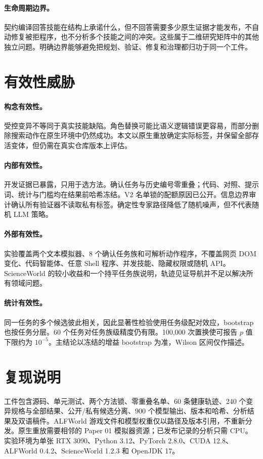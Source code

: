 \documentclass[10pt]{article}
\begin{document}
\paragraph{生命周期边界。}
契约编译回答技能在结构上承诺什么，但不回答需要多少原生证据才能发布，不自动修复被拒程序，也不分析多个技能之间的冲突。这些属于二维研究矩阵中的其他独立问题。明确边界能够避免把规划、验证、修复和治理都归功于同一个工件。

\section{有效性威胁}
\paragraph{构念有效性。}
受控变异不等同于真实技能缺陷。角色替换可能比语义逻辑错误更容易，而部分删除搜索动作在原生环境中仍然成功。本文以原生重放确定实际标签，并保留全部存活变体，但仍需在真实仓库版本上评估。

\paragraph{内部有效性。}
开发证据已暴露，只用于选方法。确认任务与历史编号零重叠；代码、对照、提示词、统计与门槛均在结果前哈希冻结。V2 名单锁的配额原因已公开。信息边界审计确认所有验证器不读取私有标签。确定性专家路径降低了随机噪声，但不代表随机 LLM 策略。

\paragraph{外部有效性。}
实验覆盖两个文本模拟器、8 个确认任务族和可解析动作程序，不覆盖网页 DOM 变化、代码智能体、任意 Shell 程序、并发技能、隐藏权限或随机 API。ScienceWorld 的较小收益和一个持平任务族说明，轨迹见证导航并不足以解决所有领域问题。

\paragraph{统计有效性。}
同一任务的多个候选彼此相关，因此显著性检验使用任务级配对效应，bootstrap 也按任务分层。60 个任务对任务族级精度仍有限。100,000 次置换使可报告 $p$ 值下限约为 $10^{-5}$。主结论以冻结的增益 bootstrap 为准，Wilson 区间仅作描述。

\section{复现说明}
工件包含源码、单元测试、两个方法锁、零重叠名单、60 条健康轨迹、240 个变异规格与全部结果、公开/私有候选分离、900 个模型输出、版本和哈希、分析结果及双语稿件。ALFWorld 游戏文件和模型权重仅以路径及版本引用，不重新分发。原生重放需要相邻的 Paper 01 模拟器资源；已发布记录的分析只需 CPU。实验环境为单张 RTX 3090、Python 3.12、PyTorch 2.8.0、CUDA 12.8、ALFWorld 0.4.2、ScienceWorld 1.2.3 和 OpenJDK 17。
\end{document}
